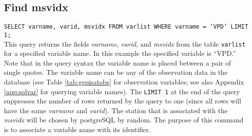 \subsection{Find msvidx}
\label{app:sqlmsvidx}
\texttt{SELECT varname, varid, msvidx FROM var\textunderscore list WHERE varname = `VPD' LIMIT 1;}\\

\noindent This query returns the fields \textit{varname}, \textit{varid}, and \textit{msvidx} from the table \texttt{var\textunderscore list} for a specified variable name.  
In this example the specified variable is ``VPD.''  Note that in the query syntax the variable name is placed between a pair of single quotes. 
The variable name can be any of the observation data in the database (see Table \ref{tab:gepisatobs} for observation variables; see also Appendix \ref{app:sqlvar} for querying variable names).  
The \texttt{LIMIT 1} at the end of the query suppresses the number of rows returned by the query to one (since all rows will have the same \textit{varname} and \textit{varid}).  
The station that is associated with the \textit{msvidx} will be chosen by postgreSQL by random.  
The purpose of this command is to associate a variable name with its identifier.

